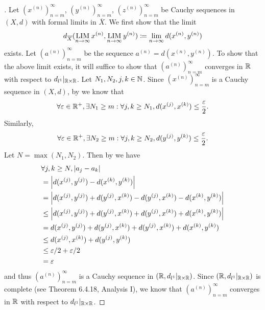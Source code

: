 \begin{proof}[]
  Let \((x^{(n)})_{n = m}^\infty\), \((y^{(n)})_{n = m}^\infty\), \((z^{(n)})_{n = m}^\infty\) be Cauchy sequences in \((X, d)\) with formal limits in \(\overline{X}\).
  We first show that the limit
  \[
    d_{\overline{X}}(\operatorname*{LIM}_{n \to \infty} x^{(n)}, \operatorname*{LIM}_{n \to \infty} y^{(n)}) \coloneqq \lim_{n \to \infty} d(x^{(n)}, y^{(n)})
  \]
  exists.
  Let \((a^{(n)})_{n = m}^\infty\) be the sequence \(a^{(n)} = d(x^{(n)}, y^{(n)})\).
  To show that the above limit exists, it will suffice to show that \((a^{(n)})_{n = m}^\infty\) converges in \(\mathbb{R}\) with respect to \(d_{l^1}|_{\mathbb{R} \times \mathbb{R}}\).
  Let \(N_1, N_2, j, k \in \mathbb{N}\).
  Since \((x^{(n)})_{n = m}^\infty\) is a Cauchy sequence in \((X, d)\), by  we know that
  \[
    \forall \varepsilon \in \mathbb{R}^+, \exists N_1 \geq m : \forall j, k \geq N_1, d(x^{(j)}, x^{(k)}) \leq \dfrac{\varepsilon}{2}.
  \]
  Similarly,
  \[
    \forall \varepsilon \in \mathbb{R}^+, \exists N_2 \geq m : \forall j, k \geq N_2, d(y^{(j)}, y^{(k)}) \leq \dfrac{\varepsilon}{2}.
  \]
  Let \(N = \max(N_1, N_2)\).
  Then by  we have
  \begin{align*}
     & \forall j, k \geq N, \left\lvert a_j - a_k\right\rvert                                                             \\
     & = \left\lvert d(x^{(j)}, y^{(j)}) - d(x^{(k)}, y^{(k)})\right\rvert                                                \\
     & = \left\lvert d(x^{(j)}, y^{(j)}) + d(y^{(j)}, x^{(k)}) - d(y^{(j)}, x^{(k)}) - d(x^{(k)}, y^{(k)})\right\rvert    \\
     & \leq \left\lvert d(x^{(j)}, y^{(j)}) + d(y^{(j)}, x^{(k)}) + d(y^{(j)}, x^{(k)}) + d(x^{(k)}, y^{(k)})\right\rvert \\
     & = d(x^{(j)}, y^{(j)}) + d(y^{(j)}, x^{(k)}) + d(y^{(j)}, x^{(k)}) + d(x^{(k)}, y^{(k)})          \\
     & \leq d(x^{(j)}, x^{(k)}) + d(y^{(j)}, y^{(k)})                                                   \\
     & \leq \varepsilon / 2 + \varepsilon / 2                                                           \\
     & = \varepsilon
  \end{align*}
  and thus \((a^{(n)})_{n = m}^\infty\) is a Cauchy sequence in \((\mathbb{R}, d_{l^1}|_{\mathbb{R} \times \mathbb{R}})\).
  Since \((\mathbb{R}, d_{l^1}|_{\mathbb{R} \times \mathbb{R}})\) is complete (see Theorem 6.4.18, Analysis I), we know that \((a^{(n)})_{n = m}^\infty\) converges in \(\mathbb{R}\) with respect to \(d_{l^1}|_{\mathbb{R} \times \mathbb{R}}\).


\end{proof}
